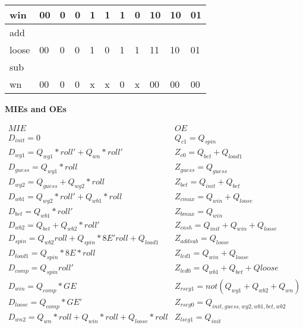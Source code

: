 \begin{enumerate}
\begin{onlysolution}
{{\begin{tabular}{l|l|l|l|l|l|l|l|l|l|l}
win   & 00      & 0      &  0     & 1	      & 1        &  1     &  0     & 10       &  10     & 01\\ \hline
add    &         &        &        &  	      &          &        &        &          &         &   \\ \hline
loose & 00      & 0      &  0     & 1	      & 0        &  1     &  1     & 11       &  10     & 01\\ \hline
sub   &         &        &        &  	      &          &        &        &          &         &   \\ \hline
wn    & 00      & 0      &  0     & x	      & x        &  0     &  x     & 00       &  00     & 00\\ 
\end{tabular}
}

\textbf{ MIEs and OEs}

$$
\begin{array}{ll}
MIE						&       OE                      \\
D_{init}= 0					&  Q_{c1} = Q_{spin}          \\
D_{wg1}= Q_{wg1}*roll'+Q_{wn}*roll'		&  Z_{c0} = Q_{bet} + Q_{load1}           \\
D_{guess} = Q_{wg1}*roll           		&  Z_{guess} = Q_{guess}           \\
D_{wg2}= Q_{guess} + Q_{wg2}*roll		&  Z_{bet}= Q_{init} + Q_{bet} \\
D_{wb1}= Q_{wg2}*roll'+Q_{wb1}*roll		&  Z_{cmux} = Q_{win}+Q_{loose}           \\
D_{bet } = Q_{wb1}*roll'			&  Z_{bmux} = Q_{win}           \\
D_{wb2}= Q_{bet} + Q_{wb2}*roll'		&  Z_{cash} = Q_{init} + Q_{win} + Q_{loose}    \\
D_{spin}= Q_{wb2}roll + Q_{spin}*8E'roll + Q_{load1}  &  Z_{addsub} = Q_{loose}     \\
D_{load1}= Q_{spin}*8E*roll    		& Z_{led1} = Q_{win} + Q_{loose} \\
D_{comp} = Q_{spin}roll'			& Z_{led0} = Q_{wb1}+Q_{bet}+Q{loose}         \\
D_{win}= Q_{comp}*GE				& Z_{rseg1} = not (Q_{wg1}+Q_{wb2}+Q_{wn})      \\
D_{loose} = Q_{comp}*GE'			& Z_{rseg0} = Q_{init,guess,wg2,wb1,bet,wb2}\\
D_{wn2} = Q_{wn}*roll + Q_{win}*roll + Q_{loose}*roll & Z_{lseg1} = Q_{init}  \\
\end{array} $$

}
\end{onlysolution}
\end{enumerate}
